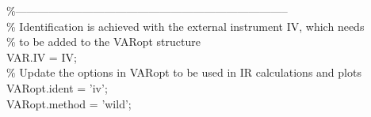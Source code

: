 \hspace{1mm}\hspace{5mm} \hspace{5mm} \hspace{5mm} \hspace{5mm} \hspace{5mm} \textcolor{matlabgreen}{\%--------------------------------------------------------------------------  }\\ 
\hspace{1mm}\hspace{5mm} \hspace{5mm} \hspace{5mm} \hspace{5mm} \hspace{5mm} \textcolor{matlabgreen}{\% Identification is achieved with the external instrument IV, which needs }\\ 
\hspace{1mm}\hspace{5mm} \hspace{5mm} \hspace{5mm} \hspace{5mm} \hspace{5mm} \textcolor{matlabgreen}{\% to be added to the VARopt structure }\\ 
\hspace{1mm}\hspace{5mm} \hspace{5mm} \hspace{5mm} \hspace{5mm} \hspace{5mm} VAR.IV = IV; \\ 
\hspace{1mm}\hspace{5mm} \hspace{5mm} \hspace{5mm} \hspace{5mm} \hspace{5mm} \textcolor{matlabgreen}{\% Update the options in VARopt to be used in IR calculations and plots }\\ 
\hspace{1mm}\hspace{5mm} \hspace{5mm} \hspace{5mm} \hspace{5mm} \hspace{5mm} VARopt.ident = \textcolor{matlabpurple}{'iv'}; \\ 
\hspace{1mm}\hspace{5mm} \hspace{5mm} \hspace{5mm} \hspace{5mm} \hspace{5mm} VARopt.method = \textcolor{matlabpurple}{'wild'}; \\ 
